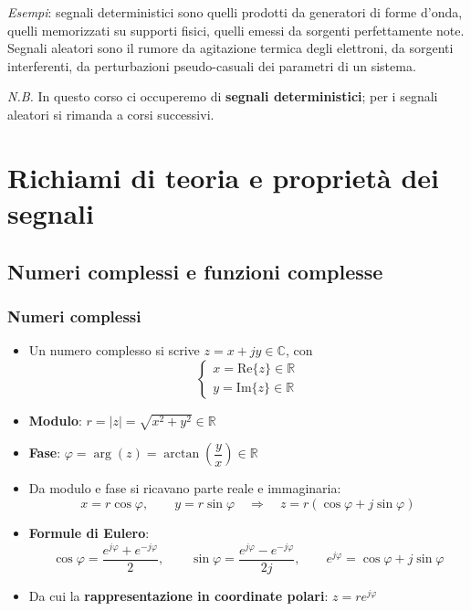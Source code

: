 \documentclass[12pt, a4paper]{article}
\begin{document}
\textit{Esempi}: segnali deterministici sono quelli prodotti da generatori di forme d'onda, quelli memorizzati su supporti fisici, quelli emessi da sorgenti perfettamente note. Segnali aleatori sono il rumore da agitazione termica degli elettroni, da sorgenti interferenti, da perturbazioni pseudo-casuali dei parametri di un sistema.

\textit{N.B.} In questo corso ci occuperemo di \textbf{segnali deterministici}; per i segnali aleatori si rimanda a corsi successivi.

\section{Richiami di teoria e proprietà dei segnali}

\subsection{Numeri complessi e funzioni complesse}

\subsubsection{Numeri complessi}
\begin{itemize}
    \item Un numero complesso si scrive $z = x+jy \in \mathbb{C}$, con
    $$\begin{cases} x = \text{Re}\{z\} \in \mathbb{R} \\ y = \text{Im}\{z\} \in \mathbb{R}\end{cases}$$
    \item \textbf{Modulo}: $r = |z| = \sqrt{x^2+y^2} \in \mathbb{R}$
    \item \textbf{Fase}: $\varphi = \arg(z) = \arctan\left(\dfrac{y}{x}\right) \in \mathbb{R}$
    \item Da modulo e fase si ricavano parte reale e immaginaria:
    $$x = r\cos\varphi, \qquad y = r\sin\varphi \quad\Rightarrow\quad z = r(\cos\varphi + j\sin\varphi)$$
    \item \textbf{Formule di Eulero}:
    $$\cos\varphi = \frac{e^{j\varphi}+e^{-j\varphi}}{2}, \qquad \sin\varphi = \frac{e^{j\varphi}-e^{-j\varphi}}{2j}, \qquad e^{j\varphi} = \cos\varphi + j\sin\varphi$$
    \item Da cui la \textbf{rappresentazione in coordinate polari}: $z = re^{j\varphi}$
\end{itemize}
\end{document}
